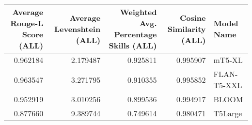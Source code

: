 \begin{tabular}{rrrrl}
\toprule
Average Rouge-L Score (ALL) & Average Levenshtein (ALL) & Weighted Avg. Percentage Skills (ALL) & Cosine Similarity (ALL) & Model Name \\
\midrule
0.962184 & 2.179487 & 0.925811 & 0.995907 & mT5-XL \\
0.963547 & 3.271795 & 0.910355 & 0.995852 & FLAN-T5-XXL \\
0.952919 & 3.010256 & 0.899536 & 0.994917 & BLOOM \\
0.877660 & 9.389744 & 0.749614 & 0.980471 & T5Large \\
\bottomrule
\end{tabular}
